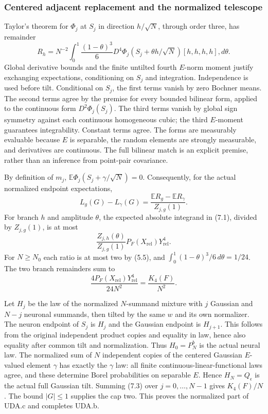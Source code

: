 \documentclass[11pt]{article}
\theoremstyle{plain}
\theoremstyle{definition}
\theoremstyle{remark}
\newcommand{\E}{\mathbb{E}}
\begin{document}
\subsubsection{Centered adjacent replacement and the normalized telescope}
Taylor's theorem for $\Phi_j$ at $S_j$ in direction $h/\sqrt N$, through
order three, has remainder
\begin{equation}
 R_h=N^{-2}\int_0^1\frac{(1-\theta)^3}{6}
 D^4\Phi_j(S_j+\theta h/\sqrt N)[h,h,h,h],d\theta.\tag{7.1}
\end{equation}
Global derivative bounds and the finite untilted fourth $E$-norm moment
justify exchanging expectations, conditioning on $S_j$ and integration.
Independence is used before tilt. Conditional on $S_j$, the first terms
vanish by zero Bochner means. The second terms agree by the premise for
every bounded bilinear form, applied to the continuous form
$D^2\Phi_j(S_j)$. The third terms vanish by global sign symmetry against
each continuous homogeneous cubic; the third $E$-moment guarantees
integrability. Constant terms agree. The forms are measurably evaluable
because $E$ is separable, the random elements are strongly measurable,
and derivatives are continuous. The full bilinear match is an explicit
premise, rather than an inference from point-pair covariance.

By definition of $m_j$, $\E\Phi_j(S_j+\gamma/\sqrt N)=0$.
Consequently, for the actual normalized endpoint expectations,
\begin{equation}
 L_g(G)-L_\gamma(G)=\frac{\E R_g-\E R_\gamma}{Z_{j,g}(1)}.\tag{7.2}
\end{equation}
For branch $h$ and amplitude $\theta$, the expected absolute integrand
in (7.1), divided by $Z_{j,g}(1)$, is at most
\[
 \frac{Z_{j,h}(\theta)}{Z_{j,g}(1)}P_F(X_{\mathrm{rel}})Y_{\mathrm{rel}}^4.
\]
For $N\ge N_0$ each ratio is at most two by (5.5), and
$\int_0^1(1-\theta)^3/6\,d\theta=1/24$. The two branch remainders sum to
\begin{equation}
 \frac{4P_F(X_{\mathrm{rel}})Y_{\mathrm{rel}}^4}{24N^2}
 =\frac{K_4(F)}{N^2}.\tag{7.3}
\end{equation}

Let $H_j$ be the law of the normalized $N$-summand mixture with $j$
Gaussian and $N-j$ neuronal summands, then tilted by the same $w$ and
its own normalizer. The neuron endpoint of $S_j$ is $H_j$ and the
Gaussian endpoint is $H_{j+1}$. This follows from the original independent
product copies and equality in law, hence also equality after common tilt
and normalization. Thus $H_0=P_N^b$ is the actual neural law. The normalized
sum of $N$ independent copies of the centered Gaussian $E$-valued element
$\gamma$ has exactly the $\gamma$ law: all finite continuous-linear-functional
laws agree, and these determine Borel probabilities on separable $E$.
Hence $H_N=Q_\epsilon$ is the actual full Gaussian tilt. Summing (7.3)
over $j=0,\ldots,N-1$ gives $K_4(F)/N$. The bound $|G|\le1$ supplies
the cap two. This proves the normalized part of UDA.c and completes UDA.b.
\end{document}
